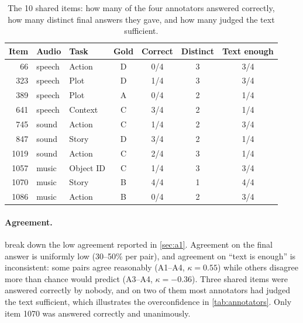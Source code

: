 \begin{table}[h]
\caption{The 10 shared items: how many of the four annotators answered correctly, how many distinct
final answers they gave, and how many judged the text sufficient.}
\label{tab:app-shared}
\centering\small
\setlength{\tabcolsep}{4pt}
\begin{tabular}{rllcccc}
\toprule
Item & Audio & Task & Gold & Correct & Distinct & Text enough \\
\midrule
66   & speech & Action      & D & 0/4 & 3 & 3/4 \\
323  & speech & Plot        & D & 1/4 & 3 & 3/4 \\
389  & speech & Plot        & A & 0/4 & 2 & 1/4 \\
641  & speech & Context     & C & 3/4 & 2 & 1/4 \\
745  & sound  & Action      & C & 1/4 & 2 & 3/4 \\
847  & sound  & Story       & D & 3/4 & 2 & 1/4 \\
1019 & sound  & Action      & C & 2/4 & 3 & 1/4 \\
1057 & music  & Object ID   & C & 1/4 & 3 & 3/4 \\
1070 & music  & Story       & B & 4/4 & 1 & 4/4 \\
1086 & music  & Action      & B & 0/4 & 2 & 3/4 \\
\bottomrule
\end{tabular}
\end{table}

\paragraph{Agreement.}  break down the low
agreement reported in \cref{sec:a1}. Agreement on the final answer is uniformly
low (30--50\% per pair), and agreement on ``text is enough'' is inconsistent:
some pairs agree reasonably (A1--A4, $\kappa{=}0.55$) while others disagree more
than chance would predict (A3--A4, $\kappa{=}-0.36$). Three shared items were
answered correctly by nobody, and on two of them most annotators had judged the
text sufficient, which illustrates the overconfidence in \cref{tab:annotators}.
Only item 1070 was answered correctly and unanimously.

